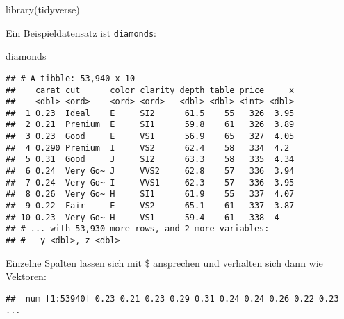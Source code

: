 \documentclass[11pt,german,a4paper]{article}
\newenvironment{Shaded}{\begin{snugshade}}{\end{snugshade}}
\newcommand{\FunctionTok}[1]{\textcolor[rgb]{0.00,0.00,0.00}{#1}}
\newcommand{\NormalTok}[1]{#1}
\newcommand{\SpecialCharTok}[1]{\textcolor[rgb]{0.00,0.00,0.00}{#1}}
\begin{document}
\begin{Shaded}
\begin{Highlighting}[]
\FunctionTok{library}\NormalTok{(tidyverse)}
\end{Highlighting}
\end{Shaded}

Ein Beispieldatensatz ist \texttt{diamonds}:

\begin{Shaded}
\begin{Highlighting}[]
\NormalTok{diamonds}
\end{Highlighting}
\end{Shaded}

\begin{verbatim}
## # A tibble: 53,940 x 10
##    carat cut      color clarity depth table price     x
##    <dbl> <ord>    <ord> <ord>   <dbl> <dbl> <int> <dbl>
##  1 0.23  Ideal    E     SI2      61.5    55   326  3.95
##  2 0.21  Premium  E     SI1      59.8    61   326  3.89
##  3 0.23  Good     E     VS1      56.9    65   327  4.05
##  4 0.290 Premium  I     VS2      62.4    58   334  4.2 
##  5 0.31  Good     J     SI2      63.3    58   335  4.34
##  6 0.24  Very Go~ J     VVS2     62.8    57   336  3.94
##  7 0.24  Very Go~ I     VVS1     62.3    57   336  3.95
##  8 0.26  Very Go~ H     SI1      61.9    55   337  4.07
##  9 0.22  Fair     E     VS2      65.1    61   337  3.87
## 10 0.23  Very Go~ H     VS1      59.4    61   338  4   
## # ... with 53,930 more rows, and 2 more variables:
## #   y <dbl>, z <dbl>
\end{verbatim}

Einzelne Spalten lassen sich mit \$ ansprechen und verhalten sich dann wie Vektoren:

\begin{Shaded}
\end{Shaded}

\begin{verbatim}
##  num [1:53940] 0.23 0.21 0.23 0.29 0.31 0.24 0.24 0.26 0.22 0.23 ...
\end{verbatim}

\begin{Shaded}
\end{Shaded}
\end{document}
